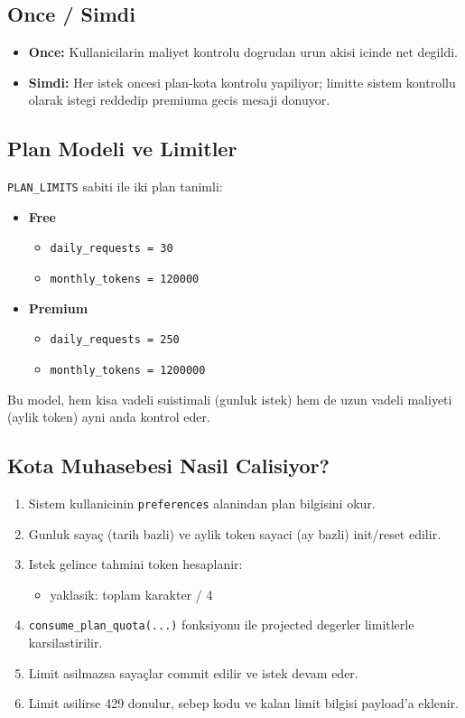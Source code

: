 \documentclass[12pt,a4paper]{article}
\begin{document}
\subsection{Once / Simdi}
\begin{itemize}[leftmargin=*]
  \item \textbf{Once:} Kullanicilarin maliyet kontrolu dogrudan urun akisi icinde net degildi.
  \item \textbf{Simdi:} Her istek oncesi plan-kota kontrolu yapiliyor; limitte sistem
  kontrollu olarak istegi reddedip premiuma gecis mesaji donuyor.
\end{itemize}

\subsection{Plan Modeli ve Limitler}
\texttt{PLAN\_LIMITS} sabiti ile iki plan tanimli:
\begin{itemize}[leftmargin=*]
  \item \textbf{Free}
  \begin{itemize}[leftmargin=*]
    \item \texttt{daily\_requests = 30}
    \item \texttt{monthly\_tokens = 120000}
  \end{itemize}
  \item \textbf{Premium}
  \begin{itemize}[leftmargin=*]
    \item \texttt{daily\_requests = 250}
    \item \texttt{monthly\_tokens = 1200000}
  \end{itemize}
\end{itemize}

Bu model, hem kisa vadeli suistimali (gunluk istek) hem de uzun vadeli maliyeti
(aylik token) ayni anda kontrol eder.

\subsection{Kota Muhasebesi Nasil Calisiyor?}
\begin{enumerate}[leftmargin=*]
  \item Sistem kullanicinin \texttt{preferences} alanindan plan bilgisini okur.
  \item Gunluk saya\c{c} (tarih bazli) ve aylik token sayaci (ay bazli) init/reset edilir.
  \item Istek gelince tahmini token hesaplanir:
  \begin{itemize}[leftmargin=*]
    \item yaklasik: toplam karakter / 4
  \end{itemize}
  \item \texttt{consume\_plan\_quota(...)} fonksiyonu ile
  projected degerler limitlerle karsilastirilir.
  \item Limit asilmazsa saya\c{c}lar commit edilir ve istek devam eder.
  \item Limit asilirse 429 donulur, sebep kodu ve kalan limit bilgisi payload'a eklenir.
\end{enumerate}
\end{document}
